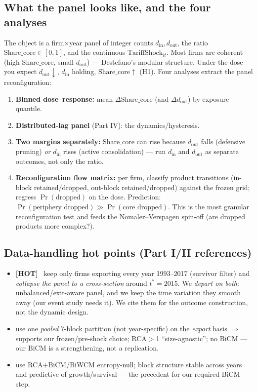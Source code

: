 \documentclass[11pt]{article}
\newcommand{\din}{d_{\mathrm{in}}}
\newcommand{\dout}{d_{\mathrm{out}}}
\newcommand{\sharecore}{\mathrm{Share\_core}}
\newcommand{\HOT}{\textbf{\textcolor{red!60!black}{[HOT]}}\ }
\begin{document}
\subsection{What the panel looks like, and the four analyses}
The object is a firm$\times$year panel of integer counts $\din,\dout$, the ratio
$\sharecore\in[0,1]$, and the continuous $\mathrm{TariffShock}_{it}$. Most firms are
coherent (high $\sharecore$, small $\dout$) --- Destefano's modular structure. Under
the dose you expect $\dout\!\downarrow$, $\din$ holding, $\sharecore\!\uparrow$ (H1).
Four analyses extract the panel reconfiguration:
\begin{enumerate}[label=(\alph*),leftmargin=1.8em,noitemsep]
  \item \textbf{Binned dose--response:} mean $\Delta\sharecore$ (and $\Delta\dout$)
        by exposure quantile.
  \item \textbf{Distributed-lag panel} (Part IV): the dynamics/hysteresis.
  \item \textbf{Two margins separately:} $\sharecore$ can rise because $\dout$ falls
        (defensive pruning) \emph{or} $\din$ rises (active consolidation) --- run
        $\din$ and $\dout$ as separate outcomes, not only the ratio.
  \item \textbf{Reconfiguration flow matrix:} per firm, classify product transitions
        (in-block retained/dropped, out-block retained/dropped) against the frozen
        grid; regress $\Pr(\text{dropped})$ on the dose. Prediction:
        $\Pr(\text{periphery dropped})\gg\Pr(\text{core dropped})$. This is the most
        granular reconfiguration test and feeds the Nomaler--Verspagen spin-off
        (are dropped products more complex?).
\end{enumerate}

\subsection{Data-handling hot points (Part I/II references)}
\begin{itemize}[leftmargin=1.4em,noitemsep]
  \item \HOT \citet{destefano2025} keep only firms exporting every year 1993--2017
        (survivor filter) and \emph{collapse the panel to a cross-section} around
        $t^\ast{=}2015$. We \emph{depart on both}: unbalanced/exit-aware panel, and
        we keep the time variation they smooth away (our event study needs it). We
        cite them for the outcome construction, not the dynamic design.
  \item \citet{destefano2025} use one \emph{pooled} 7-block partition (not
        year-specific) on the \emph{export} basis $\Rightarrow$ supports our
        frozen/pre-shock choice; RCA$>$1 ``size-agnostic''; no BiCM --- our BiCM is a
        strengthening, not a replication.
  \item \citet{bruno2018,bruno2023} use RCA$+$BiCM/BiWCM entropy-null; block
        structure stable across years and predictive of growth/survival --- the
        precedent for our required BiCM step.
\end{itemize}
\end{document}
